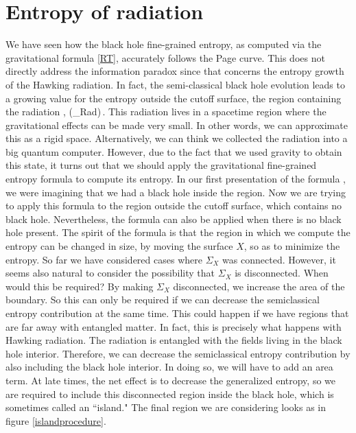 


\section{Entropy of radiation}


 
We have seen how the black hole   fine-grained entropy,  as computed via the gravitational formula \eqref{RT},  accurately follows the Page curve. This does not directly address the information paradox since that concerns the entropy growth of the Hawking radiation. 
In fact, the semi-classical black hole evolution leads to a growing value for the entropy outside the cutoff surface, the region containing the radiation \cite{Hawking:1976ra}, 
\be 
 \Ssemi(\Sigma_{\rm Rad})\,. 
 \ee 
This radiation lives in a spacetime region where the gravitational effects can be made very small. In other words, we can approximate this as a rigid space. Alternatively, we can think we collected the radiation into a big quantum computer.  
   However,   due to the fact that we used   gravity to obtain this state, it turns out that we should apply the gravitational  fine-grained entropy formula to compute its entropy.  
   In our first presentation of the formula , we were imagining that we had a black hole inside the region. Now we are trying to apply this formula to the region outside the cutoff surface, which contains no black hole. Nevertheless, the formula  can also be applied when there is no black hole present.  The spirit of the formula is that the region in which we compute the entropy can be changed in size, by moving the surface $X$, so as to minimize the entropy. So far we have considered cases where $\Sigma_X$ was connected. However, it seems also natural to consider the possibility that $\Sigma_X$ is disconnected. When would this be required? By making $\Sigma_X$ disconnected, we increase the area of the boundary. So this can only be required if we can decrease the semiclassical entropy contribution at the same time. This could happen if we have regions that are far away with entangled matter. 
   In fact, this is precisely what happens with Hawking radiation. The radiation is entangled with the fields living in the black hole interior. Therefore, we can decrease the semiclassical entropy contribution by also including the black hole interior. In doing so, we will have to add an area term.   At late times, the net effect is to decrease the generalized entropy, so we are required to include this disconnected region inside the black hole, which is sometimes called an ``island." The final region we are considering looks as in figure \ref{islandprocedure}. 
   
